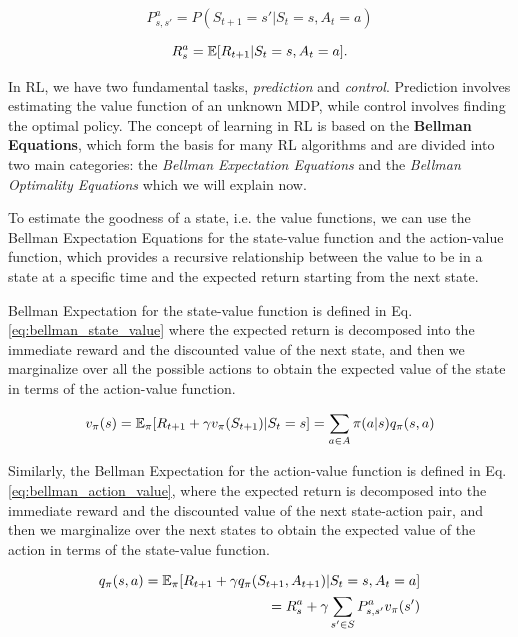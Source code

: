 \begin{equation} \label{eq:next_state}
    P_{s, s'}^a = P(S_{t+1} = s' | S_t = s, A_t = a)
\end{equation}

\begin{equation} \label{eq:next_reward}
    R_s^a = \operatorname{\mathbb{E}}[R_{t+1} | S_t = s, A_t = a].
\end{equation}

In RL, we have two fundamental tasks, \textit{prediction} and \textit{control}. 
Prediction involves estimating the value function of an unknown MDP, while control involves finding the optimal policy.
The concept of learning in RL is based on the \textbf{Bellman Equations}, which form the basis for many RL algorithms and are divided into two main categories: the \textit{Bellman Expectation Equations} and the \textit{Bellman Optimality Equations} which we will explain now.


To estimate the goodness of a state, i.e. the value functions, we can use the Bellman Expectation Equations for the state-value function and the action-value function, which provides a recursive relationship between the value to be in a state at a specific time and the expected return starting from the next state.

Bellman Expectation for the state-value function is defined in Eq. \ref{eq:bellman_state_value} where the expected return is decomposed into the immediate reward and the discounted value of the next state, and then we marginalize over all the possible actions to obtain the expected value of the state in terms of the action-value function.

\begin{equation} \label{eq:bellman_state_value}
    v_{\pi}(s) = \operatorname{\mathbb{E}}_{\pi}[R_{t+1} + \gamma v_{\pi}(S_{t+1}) | S_t = s] = \sum_{a \in A} \pi(a|s)q_{\pi}(s, a)
\end{equation}

Similarly, the Bellman Expectation for the action-value function is defined in Eq. \ref{eq:bellman_action_value}, where the expected return is decomposed into the immediate reward and the discounted value of the next state-action pair, and then we marginalize over the next states to obtain the expected value of the action in terms of the state-value function.

\begin{equation} \label{eq:bellman_action_value}
\begin{split}
    q_{\pi}(s, a) = \operatorname{\mathbb{E}}_{\pi}[R_{t+1} + \gamma q_{\pi}(S_{t+1}, A_{t+1}) | S_t = s, A_t = a] \\
    = R_s^a + \gamma \sum_{s' \in S} P_{s, s'}^a v_{\pi}(s')
    \end{split}
\end{equation}

